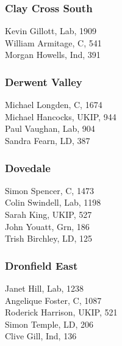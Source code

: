 \documentclass[a4paper,openany,10pt]{book}
\begin{document}
\subsubsection*{Clay Cross South}



Kevin Gillott, Lab, 1909\\
William Armitage, C, 541\\
Morgan Howells, Ind, 391\\


\subsubsection*{Derwent Valley}



Michael Longden, C, 1674\\
Michael Hancocks, UKIP, 944\\
Paul Vaughan, Lab, 904\\
Sandra Fearn, LD, 387\\


\subsubsection*{Dovedale}



Simon Spencer, C, 1473\\
Colin Swindell, Lab, 1198\\
Sarah King, UKIP, 527\\
John Youatt, Grn, 186\\
Trish Birchley, LD, 125\\


\subsubsection*{Dronfield East}



Janet Hill, Lab, 1238\\
Angelique Foster, C, 1087\\
Roderick Harrison, UKIP, 521\\
Simon Temple, LD, 206\\
Clive Gill, Ind, 136\\
\end{document}
